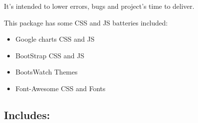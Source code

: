 \documentclass[letterpaper,10pt,english]{sphinxmanual}
\begin{document}
It's intended to lower errors, bugs and project's time to deliver.

This package has some CSS and JS batteries included:
\begin{itemize}
\item {} 
Google charts CSS and JS

\item {} 
BootStrap CSS and JS

\item {} 
BootsWatch Themes

\item {} 
Font-Awesome CSS and Fonts

\end{itemize}


\subsection{Includes:}
\end{document}
